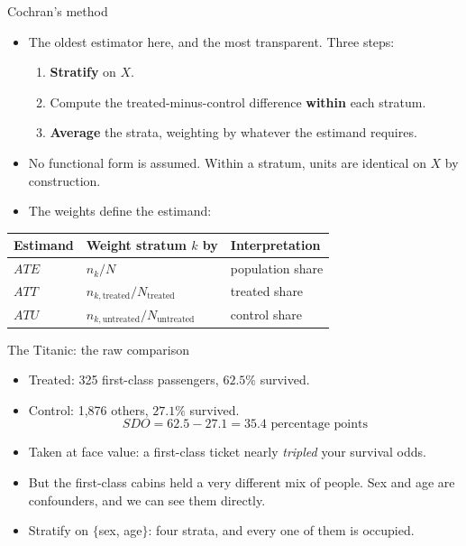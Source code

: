 \documentclass[
  11pt,
  ignorenonframetext,
  aspectratio=169,
]{beamer}
\providecommand{\tightlist}{%
  \setlength{\itemsep}{0pt}\setlength{\parskip}{0pt}}
\begin{document}
\begin{frame}{Cochran's method}
\protect{}\label{cochrans-method}
\begin{itemize}
\tightlist
\item
  The oldest estimator here, and the most transparent. Three steps:

  \begin{enumerate}
  \tightlist
  \item
    \textbf{Stratify} on \(X\).
  \item
    Compute the treated-minus-control difference \textbf{within} each
    stratum.
  \item
    \textbf{Average} the strata, weighting by whatever the estimand
    requires.
  \end{enumerate}
\item
  No functional form is assumed. Within a stratum, units are identical
  on \(X\) by construction.
\item
  The weights define the estimand:
\end{itemize}

\begin{center}
\begin{tabular}{lll}
\toprule
Estimand & Weight stratum $k$ by & Interpretation \\
\midrule
$ATE$ & $n_k / N$                      & population share \\
$ATT$ & $n_{k,\text{treated}} / N_{\text{treated}}$   & treated share \\
$ATU$ & $n_{k,\text{untreated}} / N_{\text{untreated}}$ & control share \\
\bottomrule
\end{tabular}
\end{center}
\end{frame}

\begin{frame}{The Titanic: the raw comparison}
\protect{}\label{the-titanic-the-raw-comparison}
\begin{itemize}
\tightlist
\item
  Treated: 325 first-class passengers, \(62.5\%\) survived.
\item
  Control: 1,876 others, \(27.1\%\) survived. \[
  SDO = 62.5 - 27.1 = 35.4 \text{ percentage points}
  \]
\item
  Taken at face value: a first-class ticket nearly \emph{tripled} your
  survival odds.
\item
  But the first-class cabins held a very different mix of people. Sex
  and age are confounders, and we can see them directly.
\item
  Stratify on \(\{\)sex, age\(\}\): four strata, and every one of them
  is occupied.
\end{itemize}
\end{frame}
\end{document}
